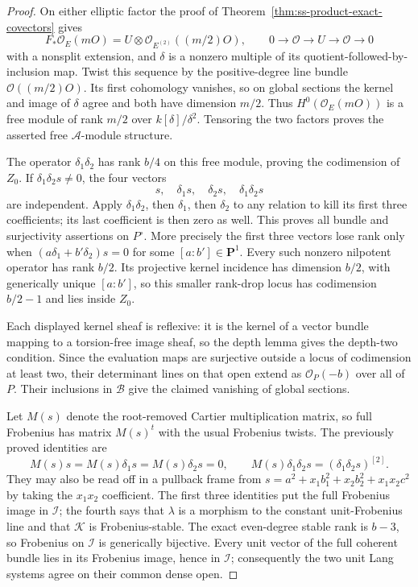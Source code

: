 \begin{proof}
On either elliptic factor the proof of
Theorem~\ref{thm:ss-product-exact-covectors} gives
\[
 F_*\mathcal O_E(mO)=U\otimes\mathcal O_{E^{(2)}}((m/2)O),
 \qquad 0\to\mathcal O\to U\to\mathcal O\to0
\]
with a nonsplit extension, and $\delta$ is a nonzero multiple of
its quotient-followed-by-inclusion map. Twist this sequence by
the positive-degree line bundle $\mathcal O((m/2)O)$.
Its first cohomology vanishes, so on global sections the kernel
and image of $\delta$ agree and both have dimension $m/2$.
Thus $H^0(\mathcal O_E(mO))$ is a free module of rank $m/2$
over $k[\delta]/\delta^2$. Tensoring the two factors proves
the asserted free $\mathcal A$-module structure.

The operator $\delta_1\delta_2$ has rank $b/4$ on this free
module, proving the codimension of $Z_0$.
If $\delta_1\delta_2s\ne0$, the four vectors
\[
                  s,\quad\delta_1s,\quad\delta_2s,
                       \quad\delta_1\delta_2s
\]
are independent. Apply $\delta_1\delta_2$, then $\delta_1$,
then $\delta_2$ to any relation to kill its first three
coefficients; its last coefficient is then zero as well.
This proves all bundle and surjectivity assertions on $P^\circ$.
More precisely the first three vectors lose rank only when
$(a\delta_1+b'\delta_2)s=0$ for some $[a:b']\in\mathbf P^1$.
Every such nonzero nilpotent operator has rank $b/2$.
Its projective kernel incidence has dimension $b/2$, with
generically unique $[a:b']$, so this smaller rank-drop locus
has codimension $b/2-1$ and lies inside $Z_0$.

Each displayed kernel sheaf is reflexive: it is the kernel of
a vector bundle mapping to a torsion-free image sheaf, so the
depth lemma gives the depth-two condition. Since the evaluation
maps are surjective outside a locus of codimension at least two,
their determinant lines on that open extend as
$\mathcal O_P(-b)$ over all of $P$.
Their inclusions in $\mathcal B$ give the claimed vanishing of
global sections.

Let $M(s)$ denote the root-removed Cartier multiplication matrix,
so full Frobenius has matrix $M(s)^t$ with the usual Frobenius
twists. The previously proved identities are
\[
 M(s)s=M(s)\delta_1s=M(s)\delta_2s=0,
 \qquad M(s)\delta_1\delta_2s=(\delta_1\delta_2s)^{[2]}.
\]
They may also be read off in a pullback frame from
$s=a^2+x_1b_1^2+x_2b_2^2+x_1x_2c^2$ by taking the
$x_1x_2$ coefficient. The first three identities put the full
Frobenius image in $\mathcal I$; the fourth says that $\lambda$
is a morphism to the constant unit-Frobenius line and that
$\mathcal K$ is Frobenius-stable. The exact even-degree stable
rank is $b-3$, so Frobenius on $\mathcal I$ is generically
bijective. Every unit vector of the full coherent bundle lies
in its Frobenius image, hence in $\mathcal I$; consequently the
two unit Lang systems agree on their common dense open.


\end{proof}
